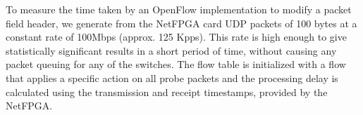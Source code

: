 To measure the time taken by an OpenFlow implementation to modify a
packet field header, we generate from the NetFPGA card UDP packets of
100 bytes at a constant rate of 100Mbps (approx. 125 Kpps). 
This rate is high enough to give statistically significant results in
a short period of time, without causing any packet queuing for any of the
switches.  The flow table is initialized with a flow that
applies a specific action on all probe packets and the processing
delay is calculated using the transmission and receipt timestamps,
provided by the NetFPGA.

